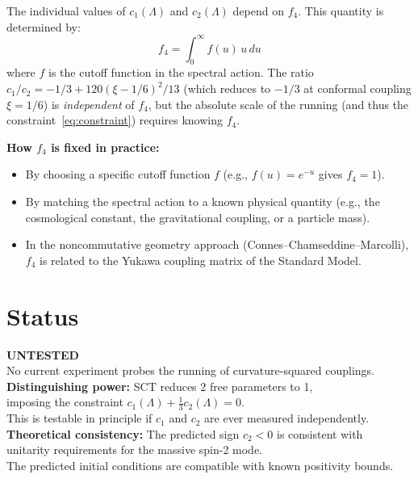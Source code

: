 \documentclass[11pt,a4paper]{article}
\begin{document}
The individual values of $c_1(\Lambda)$ and $c_2(\Lambda)$ depend on $f_4$. This quantity is determined by:
\begin{equation}
  f_4 = \int_0^\infty f(u)\,u\,du
\end{equation}
where $f$ is the cutoff function in the spectral action. The ratio $c_1/c_2 = -1/3 + 120(\xi-1/6)^2/13$ (which reduces to $-1/3$ at conformal coupling $\xi = 1/6$) is \emph{independent} of $f_4$, but the absolute scale of the running (and thus the constraint~\eqref{eq:constraint}) requires knowing $f_4$.

\noindent
\textbf{How $f_4$ is fixed in practice:}
\begin{itemize}
  \item By choosing a specific cutoff function $f$ (e.g., $f(u) = e^{-u}$ gives $f_4 = 1$).
  \item By matching the spectral action to a known physical quantity (e.g., the cosmological constant, the gravitational coupling, or a particle mass).
  \item In the noncommutative geometry approach (Connes--Chamseddine--Marcolli), $f_4$ is related to the Yukawa coupling matrix of the Standard Model.
\end{itemize}

\section{Status}

\begin{center}
\colorbox{untested!15}{\parbox{0.85\textwidth}{\centering
  \textbf{\color{untested}\Large UNTESTED}\\[6pt]
  No current experiment probes the running of curvature-squared couplings.\\[4pt]
  \textbf{Distinguishing power:} SCT reduces 2 free parameters to 1,\\
  imposing the constraint $c_1(\Lambda) + \frac{1}{3}c_2(\Lambda) = 0$.\\
  This is testable in principle if $c_1$ and $c_2$ are ever measured independently.\\[4pt]
  \textbf{Theoretical consistency:} The predicted sign $c_2 < 0$ is consistent with\\
  unitarity requirements for the massive spin-2 mode.\\
  The predicted initial conditions are compatible with known positivity bounds.
}}
\end{center}
\end{document}
